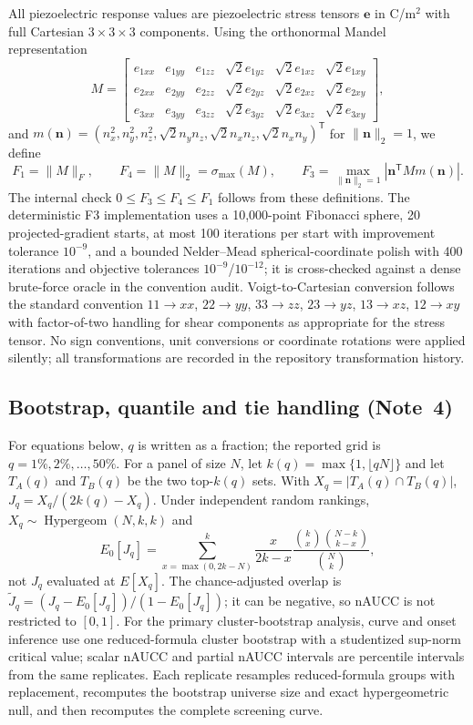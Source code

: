 \documentclass[11pt]{article}
\begin{document}
All piezoelectric response values are piezoelectric stress tensors $\mathbf{e}$ in C/m$^2$ with full Cartesian $3\times3\times3$ components.
Using the orthonormal Mandel representation
\[
M = \begin{bmatrix}
e_{1xx} & e_{1yy} & e_{1zz} & \sqrt{2}e_{1yz} & \sqrt{2}e_{1xz} & \sqrt{2}e_{1xy}\\
e_{2xx} & e_{2yy} & e_{2zz} & \sqrt{2}e_{2yz} & \sqrt{2}e_{2xz} & \sqrt{2}e_{2xy}\\
e_{3xx} & e_{3yy} & e_{3zz} & \sqrt{2}e_{3yz} & \sqrt{2}e_{3xz} & \sqrt{2}e_{3xy}
\end{bmatrix},
\]
and $m(\mathbf n)=(n_x^2,n_y^2,n_z^2,\sqrt{2}n_yn_z,\sqrt{2}n_xn_z,\sqrt{2}n_xn_y)^\mathsf{T}$ for $\|\mathbf n\|_2=1$, we define
\[
F_1=\|M\|_F,\qquad F_4=\|M\|_2=\sigma_{\max}(M),\qquad
F_3=\max_{\|\mathbf n\|_2=1}|\mathbf n^\mathsf{T}M m(\mathbf n)|.
\]
The internal check $0\leq F_3\leq F_4\leq F_1$ follows from these definitions.
The deterministic F3 implementation uses a 10,000-point Fibonacci sphere, 20 projected-gradient starts, at most 100 iterations per start with improvement tolerance $10^{-9}$, and a bounded Nelder--Mead spherical-coordinate polish with 400 iterations and objective tolerances $10^{-9}$/$10^{-12}$; it is cross-checked against a dense brute-force oracle in the convention audit.
Voigt-to-Cartesian conversion follows the standard convention $11\to xx$, $22\to yy$, $33\to zz$, $23\to yz$, $13\to xz$, $12\to xy$ with factor-of-two handling for shear components as appropriate for the stress tensor.
No sign conventions, unit conversions or coordinate rotations were applied silently; all transformations are recorded in the repository transformation history.

\subsection{Bootstrap, quantile and tie handling (Note~4)}

For equations below, $q$ is written as a fraction; the reported grid is $q=1\%,2\%,\dots,50\%$.
For a panel of size $N$, let $k(q)=\max\{1,\lfloor qN\rfloor\}$ and let $T_A(q)$ and $T_B(q)$ be the two top-$k(q)$ sets. With $X_q=|T_A(q)\cap T_B(q)|$, $J_q=X_q/(2k(q)-X_q)$.
Under independent random rankings, $X_q\sim\operatorname{Hypergeom}(N,k,k)$ and
\[
E_0[J_q]=\sum_{x=\max(0,2k-N)}^k
\frac{x}{2k-x}\frac{\binom{k}{x}\binom{N-k}{k-x}}{\binom{N}{k}},
\]
not $J_q$ evaluated at $E[X_q]$. The chance-adjusted overlap is $\widetilde J_q = (J_q-E_0[J_q])/(1-E_0[J_q])$; it can be negative, so nAUCC is not restricted to $[0,1]$.
For the primary cluster-bootstrap analysis, curve and onset inference use one reduced-formula cluster bootstrap with a studentized sup-norm critical value; scalar nAUCC and partial nAUCC intervals are percentile intervals from the same replicates. Each replicate resamples reduced-formula groups with replacement, recomputes the bootstrap universe size and exact hypergeometric null, and then recomputes the complete screening curve.
\end{document}
